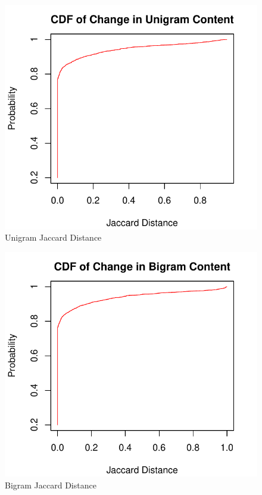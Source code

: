 \documentclass[a4paper,12pt]{article}
\begin{document}
\begin{figure}[H]
    \centering
    \includegraphics{stats/q1_unigrams.pdf}
    \caption{Unigram Jaccard Distance}
\end{figure}
\begin{figure}[H]
    \centering
    \includegraphics{stats/q1_bigrams.pdf}
    \caption{Bigram Jaccard Distance}
\end{figure}
\end{document}
